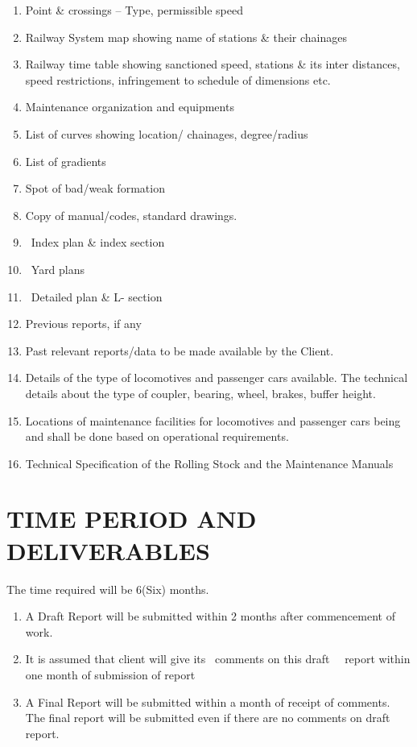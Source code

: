 \begin{enumerate}
\item Point \& crossings -- Type, permissible speed
\item Railway System map showing name of stations \& their chainages
\item Railway time table showing sanctioned speed, stations \& its inter distances, speed restrictions, infringement to
schedule of dimensions etc. 
\item Maintenance organization and equipments
\item List of curves showing location/ chainages, degree/radius
\item List of gradients
\item Spot of bad/weak formation
\item Copy of manual/codes, standard drawings.
\item \ Index plan \& index section
\item \ Yard plans
\item \ Detailed plan \& L- section 
\item Previous reports, if any 
\item Past relevant reports/data to be made available by the Client.
\item Details of the type of locomotives and passenger cars available. The technical details about the type of coupler,
bearing, wheel, brakes, buffer height.
\item Locations of maintenance facilities for locomotives and passenger cars being and shall be done based on
operational requirements.
\item Technical Specification of the Rolling Stock and the Maintenance Manuals
\end{enumerate}




\section{TIME PERIOD AND DELIVERABLES}


The time required will be 6(Six) months.


\begin{enumerate}
\item A Draft Report will be submitted within 2 months after commencement of work.
\item It is assumed that client will give its \ comments on this draft \ \ report within one month of submission of
report
\item A Final Report will be submitted within a month of receipt of comments. The final report will be submitted even if
there are no comments on draft report.
\end{enumerate}

